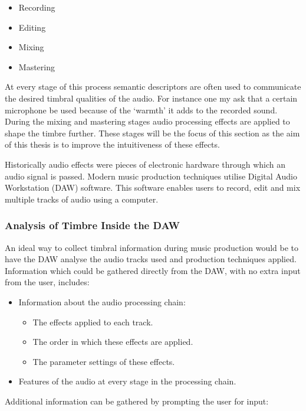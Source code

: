 			\begin{itemize}
				\item Recording
				\item Editing
				\item Mixing
				\item Mastering
			\end{itemize}

			At every stage of this process semantic descriptors are often used to communicate the desired
			timbral qualities of the audio. For instance one my ask that a certain microphone be used because of
			the `warmth' it adds to the recorded sound. During the mixing and mastering stages audio processing
			effects are applied to shape the timbre further.  These stages will be the focus of this section as
			the aim of this thesis is to improve the intuitiveness of these effects.

			Historically audio effects were pieces of electronic hardware through which an audio signal is
			passed. Modern music production techniques utilise Digital Audio Workstation (DAW) software. This
			software enables users to record, edit and mix multiple tracks of audio using a computer. 
			
		\subsubsection{Analysis of Timbre Inside the DAW}
			An ideal way to collect timbral information during music production would be to have the DAW analyse
			the audio tracks used and production techniques applied. Information which could be gathered
			directly from the DAW, with no extra input from the user, includes:

			\begin{itemize}
				\item Information about the audio processing chain:
				\begin{itemize}
					\item The effects applied to each track.
					\item The order in which these effects are applied.
					\item The parameter settings of these effects.
				\end{itemize}

				\item Features of the audio at every stage in the processing chain.
			\end{itemize}

			Additional information can be gathered by prompting the user for input:

